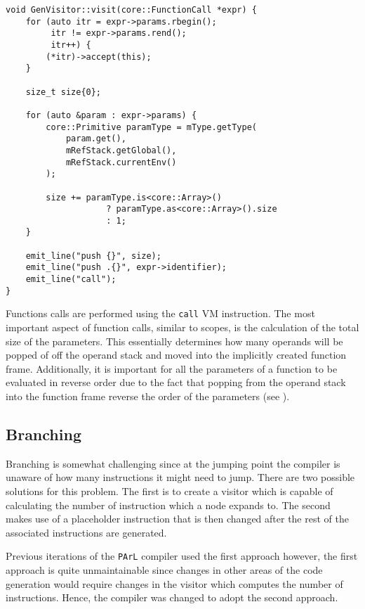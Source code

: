 \begin{lstlisting}[caption={The \texttt{visit(FunctionCall *)}
method in the \texttt{GenVisitor} class
(ir\_gen/GenVisitor.cpp).}, label=lst:funccall]
void GenVisitor::visit(core::FunctionCall *expr) {
    for (auto itr = expr->params.rbegin();
         itr != expr->params.rend();
         itr++) {
        (*itr)->accept(this);
    }

    size_t size{0};

    for (auto &param : expr->params) {
        core::Primitive paramType = mType.getType(
            param.get(),
            mRefStack.getGlobal(),
            mRefStack.currentEnv()
        );

        size += paramType.is<core::Array>()
                    ? paramType.as<core::Array>().size
                    : 1;
    }

    emit_line("push {}", size);
    emit_line("push .{}", expr->identifier);
    emit_line("call");
}
\end{lstlisting}

Functions calls are performed using the \texttt{call} VM
instruction. The most important aspect of function calls,
similar to scopes, is the calculation of the total size of the
parameters. This essentially determines how many operands will
be popped of off the operand stack and moved into the implicitly
created function frame. Additionally, it is important for all
the parameters of a function to be evaluated in reverse order
due to the fact that popping from the operand stack into the
function frame reverse the order of the parameters (see
).

\subsection{Branching}

Branching is somewhat challenging since at the jumping point the
compiler is unaware of how many instructions it might need to
jump. There are two possible solutions for this problem. The
first is to create a visitor which is capable of calculating the
number of instruction which a node expands to. The second makes
use of a placeholder instruction that is then changed after the
rest of the associated instructions are generated.

Previous iterations of the \texttt{PArL} compiler used the first
approach however, the first approach is quite unmaintainable
since changes in other areas of the code generation would
require changes in the visitor which computes the number of
instructions. Hence, the compiler was changed to adopt the
second approach.

